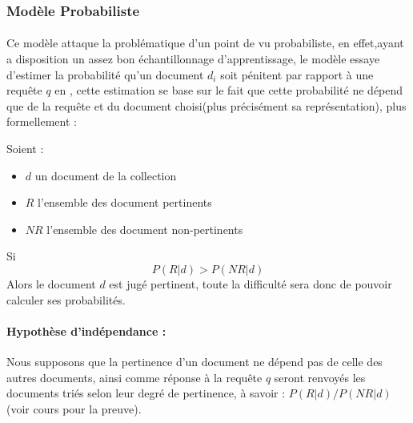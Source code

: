 \documentclass[12pt]{report}
\begin{document}
			
			\subsubsection{Modèle Probabiliste}
			\paragraph{}
			Ce modèle attaque la problématique d'un point de vu probabiliste, en effet,ayant a 
			disposition un assez bon échantillonnage d'apprentissage, le modèle essaye d'estimer 
			la probabilité qu'un document $d_i$ soit pénitent par rapport à une requête $q$ en ,
			cette estimation se base sur le fait que cette probabilité ne dépend que de la 
			requête et du document choisi(plus précisément sa représentation), plus formellement :\par
			Soient : 
			\begin{itemize}
				\item 
				$d$ un document de la collection
				\item 
				$R$ l'ensemble des document pertinents
				\item 
				$NR$ l'ensemble des document non-pertinents	
			\end{itemize}
			Si
			\[
				P(R|d) > P(NR|d)
			\]
			Alors le document $d$ est jugé pertinent, toute la difficulté sera donc de pouvoir
			calculer ses probabilités.
			\paragraph{Hypothèse d'indépendance : }
			Nous supposons que la pertinence d'un document ne dépend pas de celle des autres
			documents, ainsi comme réponse à la requête $q$ seront renvoyés les documents triés
			selon leur degré de pertinence, à savoir : $P(R|d)/P(NR|d)$ (voir cours pour la preuve).
\end{document}
